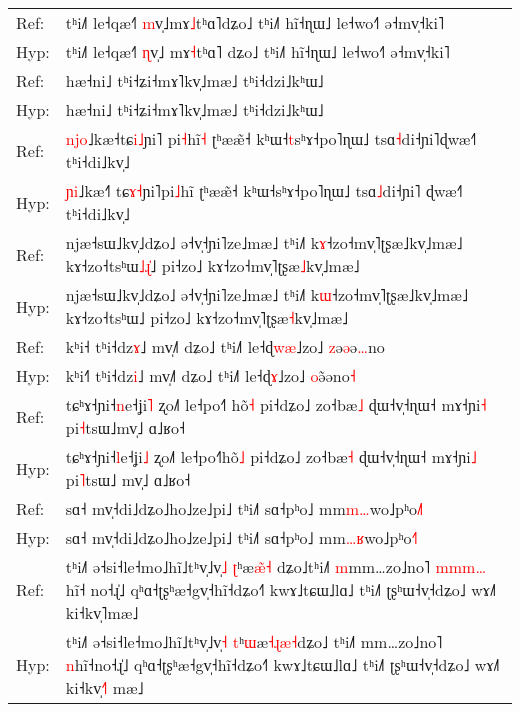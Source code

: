 \documentclass[10pt]{article}
\DeclareRobustCommand{\hl}[1]{{\textcolor{red}{#1}}}
\begin{document}
\begin{longtable}{ll}
\toprule
Ref: & tʰi˩˥ le˧qæ˧˥ \hl{m}v̩˩mɤ\hl{˩}tʰɑ˥dʑo˩ tʰi˩˥ hĩ˧ɳɯ˩ le˧wo˧˥ ə˧mv̩˧ki˥ \\ 
Hyp: & tʰi˩˥ le˧qæ˧˥ \hl{ɳ}v̩˩\hl{ }mɤ\hl{˧}tʰɑ˥\hl{ }dʑo˩ tʰi˩˥ hĩ˧ɳɯ˩ le˧wo˧˥ ə˧mv̩˧ki˥ \\ 
\midrule 
Ref: & hæ˧ni˩ tʰi˧ʑi˧mɤ˥kv̩˩mæ˩ tʰi˧dzi˩kʰɯ˩ \\ 
Hyp: & hæ˧ni˩ tʰi˧ʑi˧mɤ˥kv̩˩mæ˩ tʰi˧dzi˩kʰɯ˩ \\ 
\midrule 
Ref: & \hl{n}\hl{j}\hl{o}˩kæ˧tɕ\hl{i}\hl{˩}ɲi˥\hl{ }pi\hl{˧}hĩ\hl{˧} ʈʰææ̃˧ kʰɯ˧\hl{t}sʰɤ˧po˥ɳɯ˩ tsɑ\hl{˧}di˧ɲi˥ɖwæ˧˥ tʰi˧di˩kv̩˩ \\ 
Hyp: & \hl{ɲ}\hl{i}˩kæ˧\hl{˥}\hl{ }tɕ\hl{ɤ}\hl{˧}ɲi˥pi\hl{˩}hĩ ʈʰææ̃˧ kʰɯ˧sʰɤ˧po˥ɳɯ˩ tsɑ\hl{˩}di˧ɲi˥\hl{ }ɖwæ˧˥ tʰi˧di˩kv̩˩ \\ 
\midrule 
Ref: & njæ˧sɯ˩kv̩˩dʑo˩ ə˧v̩˧ɲi˥ze˩mæ˩ tʰi˩˥ k\hl{ɤ}˧zo˧mv̩˥ʈʂæ˩kv̩˩mæ˩ kɤ˧zo˧tsʰɯ\hl{˩}\hl{ɻ}\hl{̍}˩ pi˧zo˩ kɤ˧zo˧mv̩˥ʈʂæ\hl{˩}kv̩˩mæ˩ \\ 
Hyp: & njæ˧sɯ˩kv̩˩dʑo˩ ə˧v̩˧ɲi˥ze˩mæ˩ tʰi˩˥ k\hl{ɯ}˧zo˧mv̩˥ʈʂæ˩kv̩˩mæ˩ kɤ˧zo˧tsʰɯ˩ pi˧zo˩ kɤ˧zo˧mv̩˥ʈʂæ\hl{˧}kv̩˩mæ˩ \\ 
\midrule 
Ref: & kʰi˧ tʰi˧dz\hl{ɤ}˩ mv̩˩˥ dʑo˩ tʰi˩˥ le˧ɖ\hl{w}\hl{æ}˩zo˩ \hl{z}ə\hl{ə}ə\hl{…}no \\ 
Hyp: & kʰi˧\hl{˥} tʰi˧dz\hl{i}˩ mv̩˩˥ dʑo˩ tʰi˩˥ le˧ɖ\hl{ɤ}˩zo˩ \hl{o}ə\hl{̃}əno\hl{˧} \\ 
\midrule 
Ref: & tɕʰɤ˧ɲi˧\hl{n}e˧ʝi\hl{˥} ʐo˩˥ le˧po˧˥\hl{ }hõ\hl{˧} pi˧dʑo˩ zo˧bæ\hl{˩} ɖɯ˧v̩˧ɳɯ˧ mɤ˧ɲi\hl{˧} pi\hl{˧}tsɯ˩mv̩˩ ɑ˩ʁo˧ \\ 
Hyp: & tɕʰɤ˧ɲi˧\hl{l}e˧ʝi\hl{˩} ʐo˩˥ le˧po˧˥hõ\hl{˩} pi˧dʑo˩ zo˧bæ\hl{˧} ɖɯ˧v̩˧ɳɯ˧ mɤ˧ɲi\hl{˩} pi\hl{˥}tsɯ˩\hl{ }mv̩˩ ɑ˩ʁo˧ \\ 
\midrule 
Ref: & sɑ˧ mv̩˧di˩dʑo˩ho˩ze˩pi˩ tʰi˩˥ sɑ˧pʰo˩ mm\hl{m}\hl{…}wo˩pʰo\hl{˩}˥ \\ 
Hyp: & sɑ˧ mv̩˧di˩dʑo˩ho˩ze˩pi˩ tʰi˩˥ sɑ˧pʰo˩ mm\hl{…}\hl{ʁ}wo˩pʰo\hl{˧}˥ \\ 
\midrule 
Ref: & tʰi˩˥ ə˧si˧le˧mo˩hĩ˩tʰv̩˩v̩\hl{˩} \hl{ʈ}ʰæ\hl{æ}\hl{̃}\hl{˧}\hl{ }dʑo˩tʰi˩˥ \hl{m}mm…zo˩no˥ \hl{m}\hl{m}\hl{m}\hl{…}hĩ˧\hl{ }no˧ɻ̍˩ qʰɑ˧ʈʂʰæ˧gv̩˧hĩ˧dʑo˧˥ kwɤ˩tɕɯ˩lɑ˩ tʰi˩˥ ʈʂʰɯ˧v̩˧dʑo˩ wɤ˩˥ ki˧kv̩˥mæ˩ \\ 
Hyp: & tʰi˩˥ ə˧si˧le˧mo˩hĩ˩tʰv̩˩v̩\hl{˧} \hl{t}ʰ\hl{ɯ}æ\hl{˧}\hl{ɻ}\hl{æ}\hl{˧}dʑo˩\hl{ }tʰi˩˥ mm…zo˩no˥ \hl{n}hĩ˧no˧ɻ̍˩ qʰɑ˧ʈʂʰæ˧gv̩˧hĩ˧dʑo˧˥ kwɤ˩tɕɯ˩lɑ˩ tʰi˩˥ ʈʂʰɯ˧v̩˧dʑo˩ wɤ˩˥ ki˧kv̩\hl{˧}˥\hl{ }mæ˩ \\ 

\end{longtable}
\end{document}
